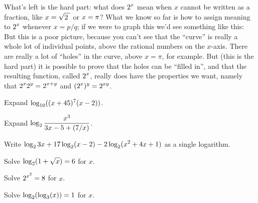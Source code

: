 What's left is the hard part: what does $\displaystyle 2^x$ mean when $x$ cannot be
written as a fraction, like $\displaystyle x=\sqrt{2\ }$ or $\displaystyle x=\pi$? What we know so
far is how to assign meaning to $\displaystyle 2^x$ whenever $x=p/q$; if we were to
graph this we'd see something like this:
But this is a poor picture, because you can't see that the ``curve''
is really a whole lot of individual points, above the rational numbers
on the $x$-axis. There are really a lot of ``holes'' in the curve,
above $x=\pi$, for example. But (this is the hard part) it is possible
to prove that the holes can be ``filled in'', and that the resulting
function, called $\displaystyle 2^x$, really does have the properties we want,
namely that $\displaystyle 2^x2^y=2^{x+y}$ and $\displaystyle (2^x)^y=2^{xy}$.

\begin{exercises}

\exercise Expand $\displaystyle\log_{10} ((x+45)^7 (x-2))$.

\exercise Expand $\displaystyle\log_2 {x^3\over 3x-5 +(7/x)}$.

\exercise Write $\displaystyle \log_2 3x + 17 \log_2 (x-2) -
2\log_2 (x^2 + 4x + 1)$ as a single logarithm.

\exercise Solve $\displaystyle \log_2 (1+ \sqrt{x} ) = 6$ for  $x$.

\exercise Solve $\displaystyle 2^{x^2} = 8$ for $x$.

\exercise Solve $\displaystyle \log_2 (\log_3 (x) ) = 1$ for $x$.

\end{exercises}
